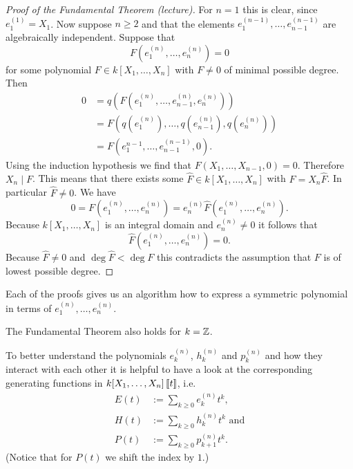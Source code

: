 \begin{proof}[Proof of the Fundamental Theorem (lecture)]
  For $n = 1$ this is clear, since $e^{(1)}_1 = X_1$. Now suppose $n \geq 2$ and that the elements $e^{(n-1)}_1, \dotsc, e^{(n-1)}_{n-1}$ are algebraically independent. Suppose that
  \[
   F\left(e^{(n)}_1, \dotsc, e^{(n)}_n\right) = 0
  \]
  for some polynomial $F \in k[X_1, \dotsc, X_n]$ with $F \neq 0$ of minimal possible degree. Then
  \begin{align*}
   0
   &= q\left(F\left(e^{(n)}_1, \dotsc, e^{(n)}_{n-1} ,e^{(n)}_n\right)\right) \\
   &= F\left( q\left(e^{(n)}_1\right), \dotsc, q\left(e^{(n)}_{n-1}\right), q\left(e^{(n)}_n\right) \right) \\
   &= F\left( e^{n-1}_1, \dotsc, e^{(n-1)}_{n-1}, 0 \right).
  \end{align*}
  Using the induction hypothesis we find that $F(X_1, \dotsc, X_{n-1}, 0) = 0$. Therefore $X_n \mid F$. This means that there exists some $\hat{F} \in k[X_1, \dotsc, X_n]$ with $F = X_n \hat{F}$. In particular $\hat{F} \neq 0$. We have
  \[
   0
   = F\left(e^{(n)}_1, \dotsc, e^{(n)}_n\right)
   = e^{(n)}_n \hat{F}\left(e^{(n)}_1, \dotsc, e^{(n)}_n\right).
  \]
  Because $k[X_1, \dotsc, X_n]$ is an integral domain and $e^{(n)}_n \neq 0$ it follows that
  \[
   \hat{F}\left(e^{(n)}_1, \dotsc, e^{(n)}_n\right) = 0.
  \]
  Because $\hat{F} \neq 0$ and $\deg \hat{F} < \deg F$ this contradicts the assumption that $F$ is of lowest possible degree.
\end{proof}


\begin{rem}
 Each of the proofs gives us an algorithm how to express a symmetric polynomial in terms of $e^{(n)}_1, \dotsc, e^{(n)}_n$.
\end{rem}


\begin{rem}
 The Fundamental Theorem also holds for $k = \mathbb{Z}$.
\end{rem}


To better understand the polynomials $e^{(n)}_k$, $h^{(n)}_k$ and $p^{(n)}_k$ and how they interact with each other it is helpful to have a look at the corresponding generating functions in $k[X_1, \dotsc, X_n]\left[\!\left[t\right]\!\right]$, i.e.
\begin{align*}
 E(t) &:= \sum_{k \geq 0} e^{(n)}_k t^k, \\
 H(t) &:= \sum_{k \geq 0} h^{(n)}_k t^k \text{ and} \\
 P(t) &:= \sum_{k \geq 0} p^{(n)}_{k+1} t^k.
\end{align*}
(Notice that for $P(t)$ we shift the index by $1$.)


